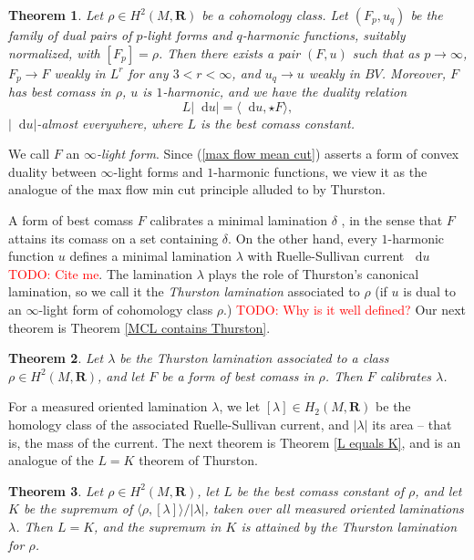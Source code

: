 \documentclass[reqno,11pt]{amsart}
\newcommand{\RR}{\mathbf{R}}
\newcommand*\dif{\mathop{}\!\mathrm{d}}
\newcommand{\dfn}[1]{\emph{#1}\index{#1}}
\newtheorem{mainthm}{Theorem}
\theoremstyle{definition}
\numberwithin{equation}{section}
\newcommand\todo[1]{\textcolor{red}{TODO: #1}}
\begin{document}
\begin{mainthm}
Let $\rho \in H^2(M, \RR)$ be a cohomology class.
Let $(F_p, u_q)$ be the family of dual pairs of $p$-light forms and $q$-harmonic functions, suitably normalized, with $[F_p] = \rho$.
Then there exists a pair $(F, u)$ such that as $p \to \infty$, $F_p \to F$ weakly in $L^r$ for any $3 < r < \infty$, and $u_q \to u$ weakly in $BV$.
Moreover, $F$ has best comass in $\rho$, $u$ is $1$-harmonic, and we have the duality relation 
\begin{equation}\label{max flow mean cut}
L|\dif u| = \langle \dif u, \star F\rangle,
\end{equation}
$|\dif u|$-almost everywhere, where $L$ is the best comass constant.
\end{mainthm}

We call $F$ an \dfn{$\infty$-light form}.
Since (\ref{max flow mean cut}) asserts a form of convex duality between $\infty$-light forms and $1$-harmonic functions, we view it as the analogue of the max flow min cut principle alluded to by Thurston.

A form of best comass $F$ calibrates a minimal lamination $\delta$ \cite{bangert_cui_2017}, in the sense that $F$ attains its comass on a set containing $\delta$.
On the other hand, every $1$-harmonic function $u$ defines a minimal lamination $\lambda$ with Ruelle-Sullivan current $\dif u$ \todo{Cite me}.
The lamination $\lambda$ plays the role of Thurston's canonical lamination, so we call it the \dfn{Thurston lamination} associated to $\rho$ (if $u$ is dual to an $\infty$-light form of cohomology class $\rho$.) \todo{Why is it well defined?}
Our next theorem is Theorem \ref{MCL contains Thurston}.

\begin{mainthm}
Let $\lambda$ be the Thurston lamination associated to a class $\rho \in H^2(M, \RR)$, and let $F$ be a form of best comass in $\rho$.
Then $F$ calibrates $\lambda$. 
\end{mainthm}

For a measured oriented lamination $\lambda$, we let $[\lambda] \in H_2(M, \RR)$ be the homology class of the associated Ruelle-Sullivan current, and $|\lambda|$ its area -- that is, the mass of the current.
The next theorem is Theorem \ref{L equals K}, and is an analogue of the $L = K$ theorem of Thurston.

\begin{mainthm}
Let $\rho \in H^2(M, \RR)$, let $L$ be the best comass constant of $\rho$, and let $K$ be the supremum of $\langle \rho, [\lambda]\rangle/|\lambda|$, taken over all measured oriented laminations $\lambda$.
Then $L = K$, and the supremum in $K$ is attained by the Thurston lamination for $\rho$.
\end{mainthm}
\end{document}
